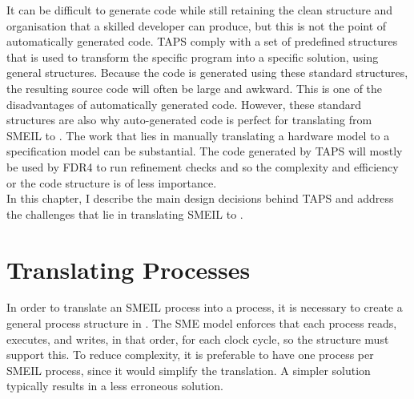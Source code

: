 It can be difficult to generate code while still retaining the clean structure and organisation that a skilled developer can produce, but this is not the point of automatically generated code. TAPS comply with a set of predefined structures that is used to transform the specific program into a specific solution, using general structures. Because the code is generated using these standard structures, the resulting source code will often be large and awkward. This is one of the disadvantages of automatically generated code. However, these standard structures are also why auto-generated code is perfect for translating from SMEIL to \cspm{}. The work that lies in manually translating a hardware model to a specification model can be substantial. The code generated by TAPS will mostly be used by FDR4 to run refinement checks and so the complexity and efficiency or the code structure is of less importance.\\

In this chapter, I describe the main design decisions behind TAPS and address the challenges that lie in translating SMEIL to \cspm{}.
\section{Translating Processes}
In order to translate an SMEIL process into a \cspm{} process, it is necessary to create a general process structure in \cspm{}. The SME model enforces that each process reads, executes, and writes, in that order, for each clock cycle, so the \cspm{} structure must support this. To reduce complexity, it is preferable to have one \cspm{} process per SMEIL process, since it would simplify the translation. A simpler solution typically results in a less erroneous solution.\\

